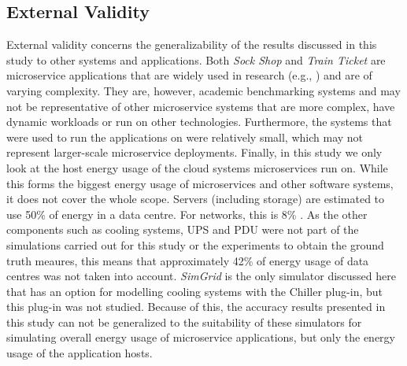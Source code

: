 \subsection{External Validity}
External validity concerns the generalizability of the results discussed in this study to other systems and applications. Both \textit{Sock Shop} and \textit{Train Ticket} are microservice applications that are widely used in research \cite{fischer_overview_2024} (e.g., \cite{gias_atom_2019, wu_microrca_2020, ikram_root_2022, zhou_benchmarking_2018, zhang_deeptralog_2022}) and are of varying complexity. They are, however, academic benchmarking systems and may not be representative of other microservice systems that are more complex, have dynamic workloads or run on other technologies. Furthermore, the systems that were used to run the applications on were relatively small, which may not represent larger-scale microservice deployments. Finally, in this study we only look at the host energy usage of the cloud systems microservices run on. While this forms the biggest energy usage of microservices and other software systems, it does not cover the whole scope. Servers (including storage) are estimated to use 50\% of energy in a data centre. For networks, this is 8\% \cite{buyya_energy_2024}. As the other components such as cooling systems, UPS and PDU were not part of the simulations carried out for this study or the experiments to obtain the ground truth meaures, this means that approximately 42\% of energy usage of data centres was not taken into account. \textit{SimGrid} is the only simulator discussed here that has an option for modelling cooling systems with the Chiller plug-in, but this plug-in was not studied. Because of this, the accuracy results presented in this study can not be generalized to the suitability of these simulators for simulating overall energy usage of microservice applications, but only the energy usage of the application hosts.


